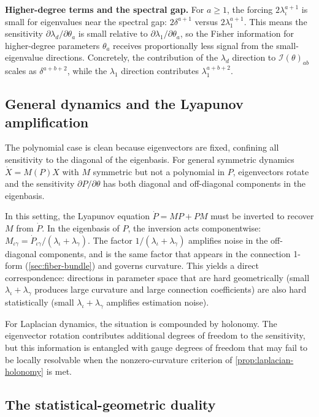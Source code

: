 \documentclass{article}
\theoremstyle{plain}
\theoremstyle{definition}
\theoremstyle{remark}
\begin{document}
\textbf{Higher-degree terms and the spectral gap.}
For $a \ge 1$, the forcing $2 \lambda_\iota^{a+1}$ is small for eigenvalues near the spectral gap: $2 \delta^{a+1}$ versus $2 \lambda_1^{a+1}$.
This means the sensitivity $\partial \lambda_d / \partial \theta_a$ is small relative to $\partial \lambda_1 / \partial \theta_a$, so the Fisher information for higher-degree parameters $\theta_a$ receives proportionally less signal from the small-eigenvalue directions.
Concretely, the contribution of the $\lambda_d$ direction to $\mathcal{I}(\theta)_{ab}$ scales as $\delta^{a+b+2}$, while the $\lambda_1$ direction contributes $\lambda_1^{a+b+2}$.

\subsection{General dynamics and the Lyapunov amplification}

The polynomial case is clean because eigenvectors are fixed, confining all sensitivity to the diagonal of the eigenbasis.
For general symmetric dynamics $\dot{X} = M(P) X$ with $M$ symmetric but not a polynomial in $P$, eigenvectors rotate and the sensitivity $\partial P / \partial \theta$ has both diagonal and off-diagonal components in the eigenbasis.

In this setting, the Lyapunov equation $\dot{P} = MP + PM$ must be inverted to recover $M$ from $\dot{P}$.
In the eigenbasis of $P$, the inversion acts componentwise: $M_{\iota\gamma} = \dot{P}_{\iota\gamma} / (\lambda_\iota + \lambda_\gamma)$.
The factor $1 / (\lambda_\iota + \lambda_\gamma)$ amplifies noise in the off-diagonal components, and is the same factor that appears in the connection 1-form (\cref{sec:fiber-bundle}) and governs curvature.
This yields a direct correspondence: directions in parameter space that are hard geometrically (small $\lambda_\iota + \lambda_\gamma$ produces large curvature and large connection coefficients) are also hard statistically (small $\lambda_\iota + \lambda_\gamma$ amplifies estimation noise).

For Laplacian dynamics, the situation is compounded by holonomy.
The eigenvector rotation contributes additional degrees of freedom to the sensitivity, but this information is entangled with gauge degrees of freedom that may fail to be locally resolvable when the nonzero-curvature criterion of \cref{prop:laplacian-holonomy} is met.

\subsection{The statistical-geometric duality}
\end{document}
